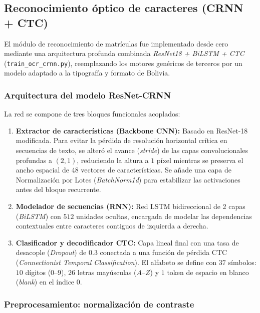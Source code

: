 \subsection{Reconocimiento óptico de caracteres (CRNN + CTC)}
\label{subsec:ocr_crnn}

El módulo de reconocimiento de matrículas fue implementado desde cero mediante una
arquitectura profunda combinada \textit{ResNet18 + BiLSTM + CTC}
(\texttt{train\_ocr\_crnn.py}), reemplazando los motores genéricos de terceros por
un modelo adaptado a la tipografía y formato de Bolivia.

\subsubsection{Arquitectura del modelo ResNet-CRNN}

La red se compone de tres bloques funcionales acoplados:

\begin{enumerate}
    \item \textbf{Extractor de características (Backbone CNN):} Basado en ResNet-18
        modificada. Para evitar la pérdida de resolución horizontal crítica en
        secuencias de texto, se alteró el avance (\textit{stride}) de las capas
        convolucionales profundas a $(2, 1)$, reduciendo la altura a $1$ píxel
        mientras se preserva el ancho espacial de $48$ vectores de características.
        Se añade una capa de Normalización por Lotes (\textit{BatchNorm1d}) para
        estabilizar las activaciones antes del bloque recurrente.

    \item \textbf{Modelador de secuencias (RNN):} Red LSTM bidireccional de 2 capas
        (\textit{BiLSTM}) con $512$ unidades ocultas, encargada de modelar las
        dependencias contextuales entre caracteres contiguos de izquierda a derecha.

    \item \textbf{Clasificador y decodificador CTC:} Capa lineal final con una tasa
        de desacople (\textit{Dropout}) de $0{.}3$ conectada a una función de pérdida
        CTC (\textit{Connectionist Temporal Classification}). El alfabeto se define
        con $37$ símbolos: $10$ dígitos ($0$--$9$), $26$ letras mayúsculas ($A$--$Z$)
        y $1$ token de espacio en blanco (\textit{blank}) en el índice $0$.
\end{enumerate}

\subsubsection{Preprocesamiento: normalización de contraste}

